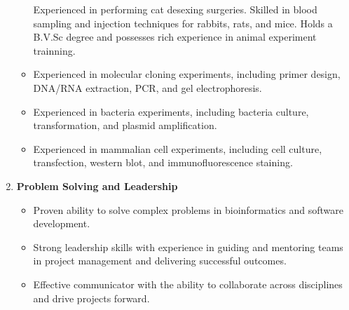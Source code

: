\begin{enumerate}
\begin{itemize}
        Experienced in performing cat desexing surgeries.
        Skilled in blood sampling and injection techniques for rabbits, rats, and mice.
        Holds a B.V.Sc degree and possesses rich experience in animal experiment trainning.
        \item Experienced in molecular cloning experiments, including primer design, DNA/RNA extraction, PCR, and gel electrophoresis.
        \item Experienced in bacteria experiments, including bacteria culture, transformation, and plasmid amplification.
        \item Experienced in mammalian cell experiments, including cell culture, transfection, western blot, and immunofluorescence staining.
    \end{itemize}
    \item \textbf{Problem Solving and Leadership}
    \begin{itemize}
        \item Proven ability to solve complex problems in bioinformatics and software development.
        \item Strong leadership skills with experience in guiding and mentoring teams in project management and delivering successful outcomes.
        \item Effective communicator with the ability to collaborate across disciplines and drive projects forward.
    \end{itemize}
\end{enumerate}


